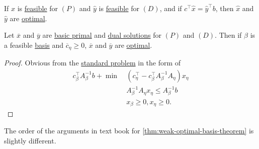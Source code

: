 \begin{corollary}\label{col:lec7-1}
	If \(\hat{x}\) is \hyperref[def:feasible-solution]{feasible} for \((P)\) and \(\hat{y}\) is \hyperref[def:feasible-solution]{feasible} for \((D)\), and if
	\(c^{\top}\hat{x} = \hat{y}^{\top} b\), then \(\hat{x}\) and \(\hat{y}\) are \hyperref[def:optimal-solution]{optimal}.
\end{corollary}

\begin{theorem}\label{thm:weak-optimal-basis-theorem}
	Let \(\overline{x}\) and \(\overline{y}\) are \hyperref[def:basic-solution]{basic primal} and \hyperref[def:dual-basic-solution]{dual solutions} for \((P)\) and \((D)\).
	Then if \(\beta\) is a feasible \hyperref[def:basic]{basis} and \(\overline{c}_{\eta}\geq 0\), \(\overline{x}\) and \(\overline{y}\) are \hyperref[def:optimal-solution]{optimal}.
\end{theorem}
\begin{proof}
	Obvious from the \hyperref[def:standard-form]{standard problem} in the form of
	\begin{align*}
		c^{\top}_{\beta}A^{-1}_{\beta}b + \min~ & (c_{\eta}^{\top} - c_{\beta}^{\top}A^{-1}_{\beta}A_{\eta})x_{\eta} \\
		                                        & A^{-1}_{\beta}A_{\eta}x_{\eta} \leq A^{-1}_{\beta}b                \\
		                                        & x_{\beta}\geq 0, x_{\eta}\geq 0.
	\end{align*}
\end{proof}

\begin{note}
	The order of the arguments in text book for \autoref{thm:weak-optimal-basis-theorem} is slightly different.
\end{note}

